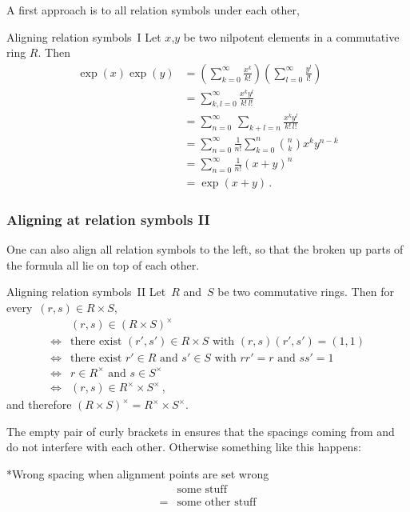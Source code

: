 A first approach is to all relation symbols under each other, 
\begin{showlatex}{Aligning relation symbols~I}
Let $x$,$y$ be two nilpotent elements in a commutative ring $R$.
Then
\begin{align*}
  \exp(x) \exp(y)
  &=
  \left( \sum_{k=0}^\infty \frac{x^k}{k!} \right)
  \left( \sum_{l=0}^\infty \frac{y^l}{l!} \right)
  \\
  &=
  \sum_{k,l=0}^\infty \frac{x^k y^l}{k! \, l!}
  \\
  &=
  \sum_{n=0}^\infty \, \sum_{k+l = n} \frac{x^k y^l}{k! \, l!}
  \\
  &=
  \sum_{n=0}^\infty \frac{1}{n!} \sum_{k=0}^n \binom{n}{k} x^k y^{n-k}
  \\
  &=
  \sum_{n=0}^\infty \frac{1}{n!} (x + y)^n
  \\
  &=
  \exp(x + y) \,.
\end{align*}
\end{showlatex}

\subsubsection{Aligning at relation symbols II}

One can also align all relation symbols to the left, so that the broken up parts of the formula all lie on top of each other.
\begin{showlatex}{Aligning relation symbols~II}
Let~$R$ and~$S$ be two commutative rings.
Then for every~$(r,s) \in R \times S$,
\begin{align*}
  {}&
  (r, s) \in (R \times S)^\times
  \\
  \iff{}&
  \text{there exist $(r', s') \in R \times S$ with $(r,s)(r',s') = (1,1)$}
  \\
  \iff{}&
  \text{there exist $r' \in R$ and $s' \in S$ with $rr' = r$ and $ss' = 1$}
  \\
  \iff{}&
  \text{$r \in R^\times$ and $s \in S^\times$}
  \\
  \iff{}&
  (r,s) \in R^\times \times S^\times \,,
\end{align*}
and therefore $(R \times S)^{\times} = R^\times \times S^\times$.
\end{showlatex}
The empty pair of curly brackets in  ensures that the spacings coming from  and~\inlinecode{\&} do not interfere with each other.
Otherwise something like this happens:
\begin{showlatex}*{Wrong spacing when alignment points are set wrong}
  \begin{align*}
     &\text{some stuff} \\
    =&\text{some other stuff}
  \end{align*}
\end{showlatex}

